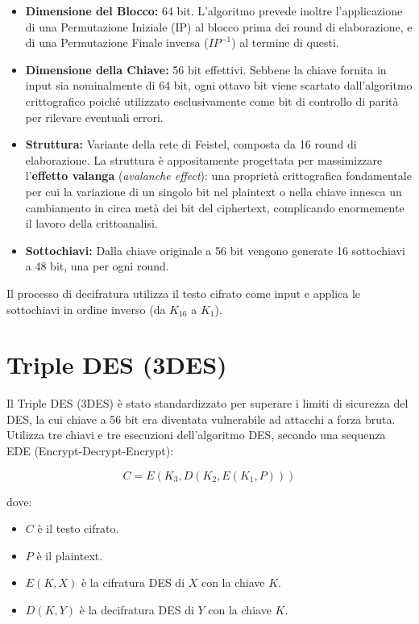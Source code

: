 \begin{itemize}
    \item \textbf{Dimensione del Blocco:} 64 bit. L'algoritmo prevede inoltre l'applicazione di una Permutazione Iniziale (IP) al blocco prima dei round di elaborazione, e di una Permutazione Finale inversa ($IP^{-1}$) al termine di questi.
    \item \textbf{Dimensione della Chiave:} 56 bit effettivi. Sebbene la chiave fornita in input sia nominalmente di 64 bit, ogni ottavo bit viene scartato dall'algoritmo crittografico poiché utilizzato esclusivamente come bit di controllo di parità per rilevare eventuali errori.
    \item \textbf{Struttura:} Variante della rete di Feistel, composta da 16 round di elaborazione. La struttura è appositamente progettata per massimizzare l'\textbf{effetto valanga} (\textit{avalanche effect}): una proprietà crittografica fondamentale per cui la variazione di un singolo bit nel plaintext o nella chiave innesca un cambiamento in circa metà dei bit del ciphertext, complicando enormemente il lavoro della crittoanalisi.
    \item \textbf{Sottochiavi:} Dalla chiave originale a 56 bit vengono generate 16 sottochiavi a 48 bit, una per ogni round.
\end{itemize}

Il processo di decifratura utilizza il testo cifrato come input e applica le sottochiavi in ordine inverso (da $K_{16}$ a $K_1$).

\section{Triple DES (3DES)}

Il Triple DES (3DES) è stato standardizzato per superare i limiti di sicurezza del DES, la cui chiave a 56 bit era diventata vulnerabile ad attacchi a forza bruta. Utilizza tre chiavi e tre esecuzioni dell'algoritmo DES, secondo una sequenza EDE (Encrypt-Decrypt-Encrypt):

$$C = E(K_3, D(K_2, E(K_1, P)))$$

dove:
\begin{itemize}
    \item $C$ è il testo cifrato.
    \item $P$ è il plaintext.
    \item $E(K, X)$ è la cifratura DES di $X$ con la chiave $K$.
    \item $D(K, Y)$ è la decifratura DES di $Y$ con la chiave $K$.
\end{itemize}


